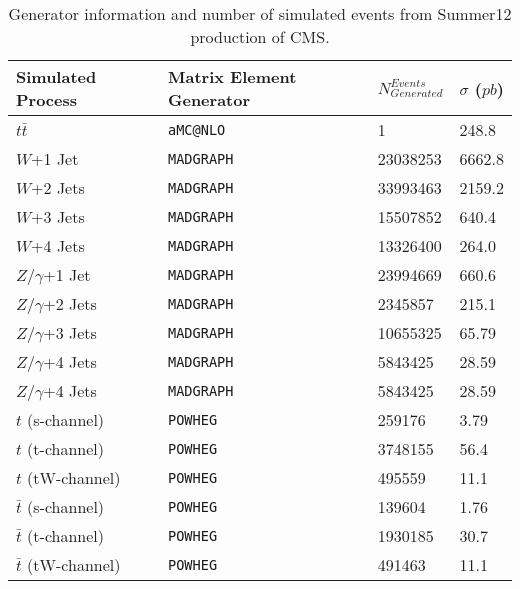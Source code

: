 \documentclass{cmspaperpdf}
\begin{document}
\begin{table}[h!]
\small
\centering
\begin{tabular}{| p{2.55 cm} | p{4 cm} | p{2 cm} | p{2 cm} |}
\hline
\textbf{Simulated Process} & \textbf{Matrix Element Generator} & $\displaystyle{N^{Events}_{Generated}}$ & \textbf{ $\sigma$ ($\displaystyle{pb}$)}\\[0.5ex]
\hline
$\displaystyle{t\bar{t}}$               & \texttt{aMC@NLO}               					 & 1 & 248.8			\\
$\displaystyle{W}$+1 Jet                & \texttt{MADGRAPH}              & 23038253 & 6662.8 \\
$\displaystyle{W}$+2 Jets               & \texttt{MADGRAPH}              & 33993463 & 2159.2 \\
$\displaystyle{W}$+3 Jets               & \texttt{MADGRAPH}              & 15507852 & 640.4  \\
$\displaystyle{W}$+4 Jets               & \texttt{MADGRAPH}              & 13326400 & 264.0  \\
$\displaystyle{Z/\gamma}$+1 Jet         & \texttt{MADGRAPH}         	   & 23994669 & 660.6  \\
$\displaystyle{Z/\gamma}$+2 Jets        & \texttt{MADGRAPH}         & 2345857 & 215.1  \\
$\displaystyle{Z/\gamma}$+3 Jets        & \texttt{MADGRAPH}          & 10655325 & 65.79  \\
$\displaystyle{Z/\gamma}$+4 Jets        & \texttt{MADGRAPH}          & 5843425 & 28.59  \\
$\displaystyle{Z/\gamma}$+4 Jets        & \texttt{MADGRAPH}          & 5843425 & 28.59  \\
$\displaystyle{t}$ (s-channel)          & \texttt{POWHEG}        & 259176 & 3.79   \\
$\displaystyle{t}$ (t-channel)          & \texttt{POWHEG}       & 3748155 & 56.4   \\
$\displaystyle{t}$ (tW-channel)         & \texttt{POWHEG}      & 495559 & 11.1   \\
$\displaystyle{\bar{t}}$ (s-channel)    & \texttt{POWHEG}     & 139604 & 1.76   \\
$\displaystyle{\bar{t}}$ (t-channel)    & \texttt{POWHEG}     & 1930185 & 30.7   \\
$\displaystyle{\bar{t}}$ (tW-channel)   & \texttt{POWHEG} & 491463 & 11.1   \\
\hline
\end{tabular}
\caption{\small Generator information and number of simulated events from Summer12 production of CMS.}

\label{tab:sim_samples2}
\end{table}
\end{document}
